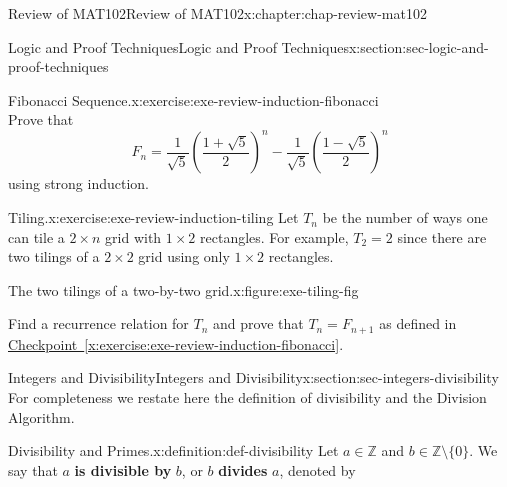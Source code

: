 \documentclass[oneside,10pt,]{book}
\newcommand{\xreffont}{\relax}
\newcommand{\terminology}[1]{\textbf{#1}}
\numberwithin{equation}{section}
\begin{document}
\begin{chapterptx}{Review of MAT102}{}{Review of MAT102}{}{}{x:chapter:chap-review-mat102}
\begin{sectionptx}{Logic and Proof Techniques}{}{Logic and Proof Techniques}{}{}{x:section:sec-logic-and-proof-techniques}
\begin{inlineexercise}{Fibonacci Sequence.}{x:exercise:exe-review-induction-fibonacci}
\begin{equation*}
\end{equation*}
Prove that%
\begin{equation*}
F_n = \frac{1}{\sqrt{5}}\left(\frac{1+\sqrt{5}}{2}\right)^n - \frac{1}{\sqrt{5}}\left(\frac{1-\sqrt{5}}{2}\right)^n
\end{equation*}
using strong induction.%
\end{inlineexercise}
\begin{inlineexercise}{Tiling.}{x:exercise:exe-review-induction-tiling}%
Let \(T_n\) be the number of ways one can tile a \(2 \times n\) grid with \(1 \times 2\) rectangles. For example, \(T_2 = 2\) since there are two tilings of a \(2 \times 2\) grid using only \(1 \times 2\) rectangles.%
\begin{figureptx}{The two tilings of a two-by-two grid.}{x:figure:exe-tiling-fig}{}%
\begin{image}{0.25}{0.5}{0.25}%
%
\end{image}%
\tcblower
\end{figureptx}%
Find a recurrence relation for \(T_n\) and prove that \(T_n = F_{n+1}\) as defined in \hyperref[x:exercise:exe-review-induction-fibonacci]{Checkpoint~{\xreffont\ref{x:exercise:exe-review-induction-fibonacci}}}.%
\end{inlineexercise}
\end{sectionptx}
%
%
\typeout{************************************************}
\typeout{************************************************}
%
\begin{sectionptx}{Integers and Divisibility}{}{Integers and Divisibility}{}{}{x:section:sec-integers-divisibility}
For completeness we restate here the definition of divisibility and the Division Algorithm.%
\begin{definition}{Divisibility and Primes.}{x:definition:def-divisibility}%
\label{g:notation:id463421} Let \(a \in \mathbb{Z}\) and \(b \in \mathbb{Z} \setminus \{0\}\). We say that \(a\) \terminology{is divisible by} \(b\), or \(b\) \terminology{divides} \(a\), denoted by%

\end{definition}
\end{sectionptx}
\end{chapterptx}
\end{document}

